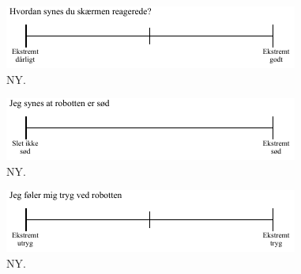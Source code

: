 %
\begin{figure}[H]
\centering
\includegraphics[width =\textwidth]{Figure/UdvalgteSkalaer/SkaermensReaktion} 
\caption{NY.}
\label{fig:SkalaSkaermensReaktion}
\end{figure}
\noindent
%

%
\begin{figure}[H]
\centering
\includegraphics[width =\textwidth]{Figure/UdvalgteSkalaer/SoedR} 
\caption{NY.}
\label{fig:SkalaSoedR}
\end{figure}
\noindent
%

%
\begin{figure}[H]
\centering
\includegraphics[width =\textwidth]{Figure/UdvalgteSkalaer/TrygVedR} 
\caption{NY.}
\label{fig:SkalaTrygVedR}
\end{figure}
\noindent
%
